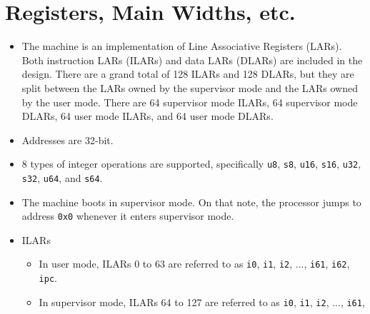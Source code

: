 \documentclass{article}
\begin{document}
\section{Registers, Main Widths, etc.}
	\begin{itemize}
	\item The machine is an implementation of Line Associative Registers
		(LARs). Both instruction LARs (ILARs) and data LARs (DLARs) are
		included in the design. There are a grand total of 128 ILARs and
		128 DLARs, but they are split between the LARs owned by the
		supervisor mode and the LARs owned by the user mode. There are 64
		supervisor mode ILARs, 64 supervisor mode DLARs, 64 user mode
		ILARs, and 64 user mode DLARs.
	\item Addresses are 32-bit.
	\item 8 types of integer operations are supported, specifically
		\texttt{u8}, \texttt{s8},
		\texttt{u16}, \texttt{s16},
		\texttt{u32}, \texttt{s32},
		\texttt{u64}, and \texttt{s64}.
	\item The machine boots in supervisor mode. On that note, the processor
		jumps to address \texttt{0x0} whenever it enters supervisor mode.
	\item ILARs
		\begin{itemize}
		\item In user mode, ILARs 0 to 63 are referred to as \texttt{i0},
			\texttt{i1}, \texttt{i2}, ..., \texttt{i61}, \texttt{i62},
			\texttt{ipc}.
		\item In supervisor mode, ILARs 64 to 127 are referred to as
			\texttt{i0}, \texttt{i1}, \texttt{i2}, ..., \texttt{i61},

\end{itemize}
\end{itemize}
\end{document}
